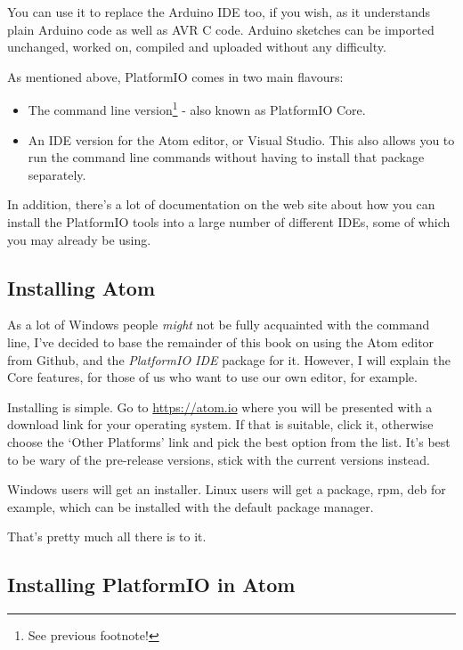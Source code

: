 You can use it to replace the Arduino IDE too, if you wish, as it
understands plain Arduino code as well as AVR C code. Arduino sketches
can be imported unchanged, worked on, compiled and uploaded without any difficulty.

As mentioned above, PlatformIO comes in two main flavours:

\begin{itemize}
\item
  The command line version\footnote{See previous footnote!} - also known as PlatformIO Core.
\item
  An IDE version for the Atom editor, or Visual Studio. This also allows
  you to run the command line commands without having to install that
  package separately.
\end{itemize}

In addition, there's a lot of documentation on the web site about how
you can install the PlatformIO tools into a large number of different
IDEs, some of which you may already be using.

\subsection{Installing Atom}\label{installing-atom}

As a lot of Windows people \emph{might} not be fully acquainted with the command line, I've decided to base the remainder of this book on using the Atom editor from Github, and the \emph{PlatformIO IDE} package for it. However, I will explain the Core features, for those of us who want to use our own editor, for example.

Installing is simple. Go to \href{https://atom.io}{https://atom.io} where you will be presented with a download link for your operating system. If that is suitable, click it, otherwise choose the `Other Platforms' link and pick the best option from the list. It's best to be wary of the pre-release versions, stick with the current versions instead.

Windows users will get an installer. Linux users will get a package, rpm, deb for example, which can be installed with the default package manager.

That's pretty much all there is to it.

\subsection{Installing PlatformIO in
Atom}\label{installing-platformio-in-atom}

